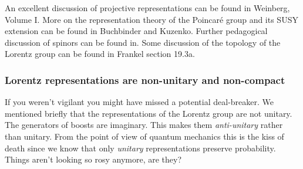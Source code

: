 \documentclass[12pt, oneside]{report}    %
\begin{document}
An excellent discussion of projective representations can be found in Weinberg, Volume I\autocite{Weinberg:1995mt}. 
    More on the representation theory of the Poincar\'e group and its SUSY extension can be found in Buchbinder and Kuzenko\autocite{Buchbinder:1998qv}. Further pedagogical discussion of spinors can be found in\autocite{spinorspanner}. Some discussion of the topology of the Lorentz group can be found in Frankel section 19.3a\autocite{Frankel:2004}.

\subsubsection{Lorentz representations are non-unitary and non-compact}\label{sec:SUSYalg:nonunitary}
If you weren't vigilant you might have missed a potential deal-breaker. We mentioned briefly that the representations of the Lorentz group are not unitary. The generators of boosts are imaginary. This makes them \textit{anti-unitary} rather than unitary. From the point of view of quantum mechanics this is the kiss of death since we know that only \textit{unitary} representations preserve probability. Things aren't looking so rosy anymore, are they? 
\end{document}
